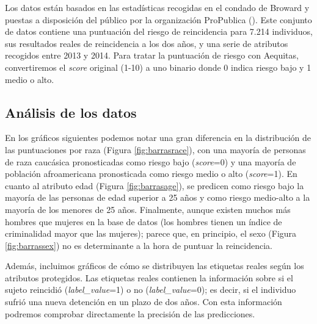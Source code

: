 Los datos están basados en las estadísticas recogidas en el condado de Broward y puestas a disposición del público por la organización ProPublica (\cite{condena2016}). Este conjunto de datos contiene una puntuación del riesgo de reincidencia para 7.214 individuos, sus resultados reales de reincidencia a los dos años, y una serie de atributos recogidos entre 2013 y 2014. Para tratar la puntuación de riesgo con Aequitas, convertiremos el \textit{score} original (1-10) a uno binario donde 0 indica riesgo bajo y 1 medio o alto.

\subsection*{Análisis de los datos}

En los gráficos siguientes podemos notar una gran diferencia en la distribución de las puntuaciones por raza (Figura \ref{fig:barrasrace}), con una mayoría de personas de raza caucásica pronosticadas como riesgo bajo (\textit{score}=0) y una mayoría de población afroamericana pronosticada como riesgo medio o alto (\textit{score}=1). En cuanto al atributo edad (Figura \ref{fig:barrasage}), se predicen como riesgo bajo la mayoría de las personas de edad superior a 25 años y como riesgo medio-alto a la mayoría de los menores de 25 años. Finalmente, aunque existen muchos más hombres que mujeres en la base de datos (los hombres tienen un índice de criminalidad mayor que las mujeres); parece que, en principio, el sexo (Figura \ref{fig:barrassex}) no es determinante a la hora de puntuar la reincidencia.

Además, incluimos gráficos de cómo se distribuyen las etiquetas reales según los atributos protegidos. Las etiquetas reales contienen la información sobre si el sujeto reincidió (\textit{label\_value}=1) o no (\textit{label\_value}=0); es decir, si el individuo sufrió una nueva detención en un plazo de dos años. Con esta información podremos comprobar directamente la precisión de las predicciones.\\

